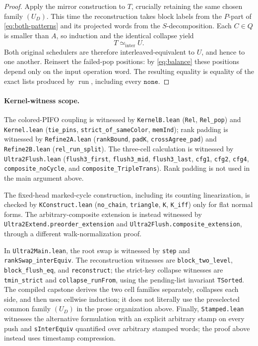 \documentclass[11pt]{article}
\theoremstyle{definition}
\newcommand{\run}{\operatorname{run}}
\newcommand{\None}{\texttt{none}}
\newcommand{\intereq}{\simeq_{\mathrm{inter}}}
\begin{document}
\begin{proof}
Apply the mirror construction to \(T\), crucially retaining the same
chosen family \((U_D)\).  This time the reconstruction takes block labels
from the \(P\)-part of \eqref{eq:both-patterns} and its projected words from
the \(S\)-decomposition.  Each \(C\in Q\) is smaller than \(A\), so
induction and the identical collapse yield
\begin{equation}
  T\intereq U.
  \tag{19}\label{eq:T-U}
\end{equation}
Both original schedulers are therefore interleaved-equivalent to \(U\), and
hence to one another.  Reinsert the failed-pop positions: by
\eqref{eq:balance} these positions depend only on the input operation word.
The resulting equality is equality of the exact lists produced by
\(\run\), including every \(\None\).
\end{proof}

\begingroup
\raggedright
\footnotesize
\paragraph{Kernel-witness scope.}
The colored-PIFO coupling is witnessed by
\texttt{KernelB.lean} (\texttt{Rel}, \texttt{Rel\_pop}) and
\texttt{Kernel.lean} (\texttt{tie\_pins},
\texttt{strict\_\allowbreak of\_\allowbreak sameColor}, \texttt{memInd});
rank padding is witnessed
by \texttt{Refine2A.lean} (\texttt{rankBound}, \texttt{padK},
\texttt{crossAgree\_\allowbreak pad}) and \texttt{Refine2B.lean}
(\texttt{rel\_\allowbreak run\_\allowbreak split}).  The three-cell
calculation is witnessed by
\texttt{Ultra2Flush.lean} (\texttt{flush3\_first},
\texttt{flush3\_mid}, \texttt{flush3\_last}, \texttt{cfg1},
\texttt{cfg2}, \texttt{cfg4},
\texttt{composite\_\allowbreak noCycle}, and
\texttt{composite\_\allowbreak TripleTrans}).  Rank padding is not used in
the main argument above.

The fixed-head marked-cycle construction, including its counting
linearization, is checked by \texttt{KConstruct.lean}
(\texttt{no\_chain}, \texttt{triangle}, \texttt{K}, \texttt{K\_iff}) only
for flat normal forms.  The arbitrary-composite extension is instead
witnessed by
\texttt{Ultra2Extend.\allowbreak preorder\_\allowbreak extension} and
\texttt{Ultra2Flush.\allowbreak composite\_\allowbreak extension}, through
a different
walk-normalization proof.

In \texttt{Ultra2Main.lean}, the root swap is witnessed by \texttt{step} and
\texttt{rankSwap\_\allowbreak interEquiv}.  The reconstruction witnesses
are \texttt{block\_\allowbreak two\_\allowbreak level},
\texttt{block\_\allowbreak flush\_\allowbreak eq}, and
\texttt{reconstruct}; the strict-key collapse witnesses are
\texttt{tmin\_\allowbreak strict} and
\texttt{collapse\_\allowbreak runFrom}, using the pending-list invariant
\texttt{TSorted}.  The compiled capstone derives the two cell families
separately, collapses each side, and then uses cellwise induction; it does
not literally use the preselected common family \((U_D)\) in the prose
organization above.  Finally, \texttt{Stamped.lean} witnesses the
alternative formulation with an explicit arbitrary stamp on every push and
\texttt{sInterEquiv} quantified over arbitrary stamped words; the proof
above instead uses timestamp compression.
\endgroup
\end{document}
